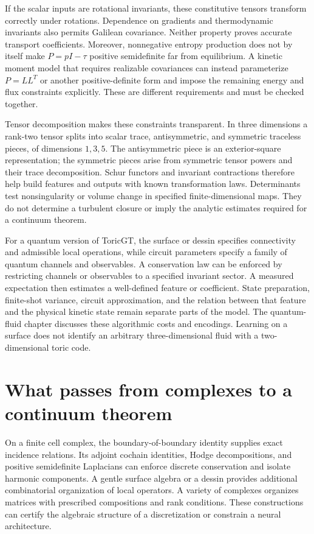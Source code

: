 If the scalar inputs are rotational invariants, these constitutive
tensors transform correctly under rotations.  Dependence on gradients
and thermodynamic invariants also permits Galilean covariance.
Neither property proves accurate transport coefficients.  Moreover,
nonnegative entropy production does not by itself make
$P=pI-\tau$ positive semidefinite far from equilibrium.  A kinetic
moment model that requires realizable covariances can instead
parameterize $P=LL^T$ or another positive-definite form and impose
the remaining energy and flux constraints explicitly.  These are
different requirements and must be checked together.

Tensor decomposition makes these constraints transparent.  In three
dimensions a rank-two tensor splits into scalar trace, antisymmetric,
and symmetric traceless pieces, of dimensions $1,3,5$.  The
antisymmetric piece is an exterior-square representation; the
symmetric pieces arise from symmetric tensor powers and their
trace decomposition.  Schur functors and invariant contractions
therefore help build features and outputs with known transformation
laws.  Determinants test nonsingularity or volume change in specified
finite-dimensional maps.  They do not determine a turbulent closure
or imply the analytic estimates required for a continuum theorem.

For a quantum version of ToricGT, the surface or dessin specifies
connectivity and admissible local operations, while circuit parameters
specify a family of quantum channels and observables.  A conservation
law can be enforced by restricting channels or observables to a
specified invariant sector.  A measured expectation then estimates a
well-defined feature or coefficient.  State preparation, finite-shot
variance, circuit approximation, and the relation between that feature
and the physical kinetic state remain separate parts of the model.
The quantum-fluid chapter discusses these algorithmic costs and
encodings.  Learning on a surface does not identify an arbitrary
three-dimensional fluid with a two-dimensional toric code.

\section{What passes from complexes to a continuum theorem}

On a finite cell complex, the boundary-of-boundary identity supplies
exact incidence relations.  Its adjoint cochain identities, Hodge
decompositions, and positive semidefinite Laplacians can enforce
discrete conservation and isolate harmonic components.  A gentle
surface algebra or a dessin provides additional combinatorial
organization of local operators.  A variety of complexes organizes
matrices with prescribed compositions and rank conditions.  These
constructions can certify the algebraic structure of a discretization
or constrain a neural architecture.

